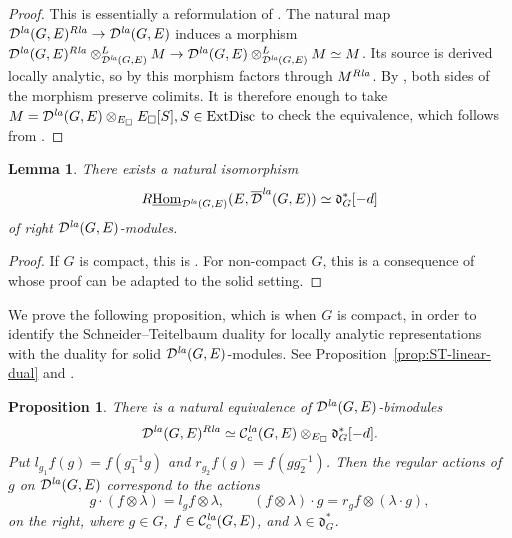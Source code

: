 \documentclass[a4paper,10pt]{amsart}
\theoremstyle{remark}
\theoremstyle{definition}
\theoremstyle{plain}
\newtheorem{lemma}[theorem]{Lemma}
\newtheorem{proposition}[theorem]{Proposition}
\numberwithin{equation}{section}
\newcommand{\calC}{{\mathcal C}}
\newcommand{\calD}{{\mathcal D}}
\newcommand{\Hom}{{\rm Hom}}
\newcommand{\uHom}{\underline{\Hom}}
\newcommand{\la}{{\it la}}
\begin{document}
\begin{proof}
This is essentially a reformulation of \cite[Cor.~3.2.14(1)]{JC23}. The natural map $\calD^{\la}(G,E)^{R\la}\allowbreak\to\calD^{\la}(G,E)$ induces a morphism $\calD^{\la}(G,E)^{R\la}\otimes^L_{\calD^{\la}(G,E)}M\to \calD^{\la}(G,E)\otimes^L_{\calD^{\la}(G,E)}M\simeq M$. Its source is derived locally analytic, so by \cite[Cor.~3.3.7]{JC23} this morphism factors through $M^{R\la}$. By \cite[Prop.~3.2.6(3)]{JC23}, both sides of the morphism preserve colimits. It is therefore enough to take $M=\calD^{\la}(G,E)\otimes_{E_\square}E_\square[S], S\in\mathrm{ExtDisc}$ to check the equivalence, which follows from \cite[Cor.~3.2.15]{JC23}.
\end{proof}
\begin{lemma}\label{lemmadualcharacter}
	There exists a natural isomorphism 
	\[R\uHom_{\calD^{\la}(G,E)}(E,\overline{\calD}^{\la}(G,E))\simeq \mathfrak{d}_G^*[-d]\]
	of right $\calD^{\la}(G,E)$-modules.
\end{lemma}
\begin{proof}
	If $G$ is compact, this is \cite[Lem.~3.2.10]{JC23}. For non-compact $G$, this is a consequence of \cite[Cor.~3.7]{ST05} whose proof can be adapted to the solid setting. 
\end{proof}
We prove the following proposition, which is \cite[Cor.~3.2.14(1)]{JC23} when $G$ is compact, in order to identify the Schneider--Teitelbaum duality for locally analytic representations with the duality for solid $\calD^{\la}(G,E)$-modules. See Proposition~\ref{prop:ST-linear-dual} and \cite[Rem.~1.2.3(1)]{JC23}.
\begin{proposition}\label{prop:DlaGRla}
There is a natural equivalence of $\calD^{\la}(G,E)$-bimodules
\[
 \calD^{\la}(G,E)^{R\la}
 \simeq
 \calC_c^{\la}(G,E)\otimes_{E_\square}\mathfrak d_G^*[-d].
\]
Put $l_{g_1}f(g)=f(g_1^{-1}g)$ and $r_{g_2}f(g)=f(gg_2^{-1})$. Then the regular actions of $g$ on $\calD^{\la}(G,E)$ correspond to the actions
\[
 g\cdot(f\otimes\lambda)=l_gf\otimes\lambda,
 \qquad
 (f\otimes\lambda)\cdot g=r_gf\otimes(\lambda\cdot g),
\]
on the right, where $g\in G$, $f\in \calC_c^{\la}(G,E)$, and $\lambda\in\mathfrak d_G^*$.
\end{proposition}
\end{document}
